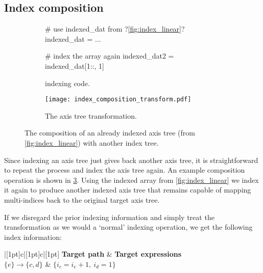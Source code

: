 \documentclass[thesis]{subfiles}
\begin{document}
\subsection{Index composition}
\label{sec:index_composition}

\begin{figure}
  \centering

  \begin{subfigure}{.9\textwidth}
    \begin{pyalg2}
      # use indexed_dat from ?\cref{fig:index_linear}?
      indexed_dat = ...

      # index the array again
      indexed_dat2 = indexed_dat[1::, 1]
    \end{pyalg2}

    \caption{ indexing code.}
    \label{fig:index_composition_code}
  \end{subfigure}

  \vspace{1em}

  \begin{subfigure}{\textwidth}
    \centering
    \texttt{[image: index\_composition\_transform.pdf]}
    \caption{The axis tree transformation.}
    \label{fig:index_composition_transform}
  \end{subfigure}

  \caption{
    The composition of an already indexed axis tree (from \cref{fig:index_linear}) with another index tree.
  }
  \label{fig:index_composition}
\end{figure}

Since indexing an axis tree just gives back another axis tree, it is straightforward to repeat the process and index the axis tree again.
An example composition operation is shown in \cref{fig:index_composition}.
Using the indexed array from \cref{fig:index_linear} we index it again to produce another indexed axis tree that remains capable of mapping multi-indices back to the original target axis tree.

If we disregard the prior indexing information and simply treat the transformation as we would a `normal' indexing operation, we get the following index information:

\begin{center}
  \begin{tblr}{|[1pt]c|[1pt]c|[1pt]}
    \hline[1pt]
    \textbf{Target path} & \textbf{Target expressions} \\
    \hline[1pt]
    $\{e\} \to \{ c, d \}$ & $\{ i_c = i_e + 1,\ i_d = 1 \}$ \\
    \hline[1pt]
  \end{tblr}
\end{center}
\end{document}
